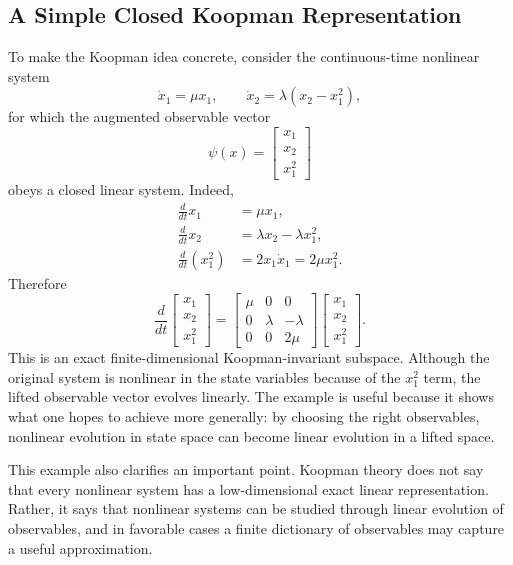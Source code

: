 \documentclass[11pt]{article}
\begin{document}
\subsection{A Simple Closed Koopman Representation}
To make the Koopman idea concrete, consider the continuous-time nonlinear system
\begin{equation}
    \dot{x}_1 = \mu x_1, \qquad \dot{x}_2 = \lambda (x_2 - x_1^2),
\end{equation}
for which the augmented observable vector
\begin{equation}
    \psi(x) = \begin{bmatrix} x_1 \\ x_2 \\ x_1^2 \end{bmatrix}
\end{equation}
obeys a closed linear system. Indeed,
\begin{align}
    \frac{d}{dt} x_1 &= \mu x_1, \\
    \frac{d}{dt} x_2 &= \lambda x_2 - \lambda x_1^2, \\
    \frac{d}{dt}(x_1^2) &= 2 x_1 \dot{x}_1 = 2\mu x_1^2.
\end{align}
Therefore
\begin{equation}
    \frac{d}{dt}
    \begin{bmatrix}
        x_1 \\ x_2 \\ x_1^2
    \end{bmatrix}
    =
    \begin{bmatrix}
        \mu & 0 & 0 \\
        0 & \lambda & -\lambda \\
        0 & 0 & 2\mu
    \end{bmatrix}
    \begin{bmatrix}
        x_1 \\ x_2 \\ x_1^2
    \end{bmatrix}.
\end{equation}
This is an exact finite-dimensional Koopman-invariant subspace. Although the original system is nonlinear in the state variables because of the $x_1^2$ term, the lifted observable vector evolves linearly. The example is useful because it shows what one hopes to achieve more generally: by choosing the right observables, nonlinear evolution in state space can become linear evolution in a lifted space.

This example also clarifies an important point. Koopman theory does not say that every nonlinear system has a low-dimensional exact linear representation. Rather, it says that nonlinear systems can be studied through linear evolution of observables, and in favorable cases a finite dictionary of observables may capture a useful approximation.
\end{document}
